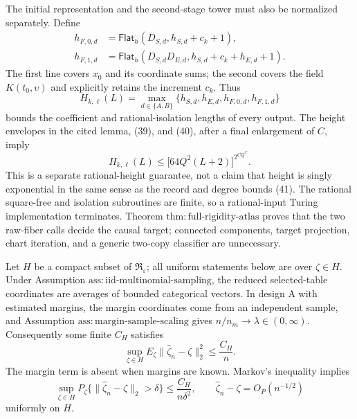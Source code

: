 The initial representation and the second-stage tower must also be normalized separately.  Define
\[
 \begin{aligned}
 h_{F,0,d}
 &=\mathsf{Flat}_h(D_{S,d},h_{S,d}+c_k+1),\\
 h_{F,1,d}
 &=\mathsf{Flat}_h
   (D_{S,d}D_{E,d},h_{S,d}+c_k+h_{E,d}+1).
 \end{aligned}                                             \tag{45}
\]
The first line covers \(x_0\) and its coordinate sums; the second covers the field \(K(t_0,\upsilon)\) and explicitly retains the increment \(c_k\).  Thus
\[
 H_{k,\ell}(L)
 =\max_{d\in\{A,B\}}
   \{h_{S,d},h_{E,d},h_{F,0,d},h_{F,1,d}\}               \tag{46}
\]
bounds the coefficient and rational-isolation lengths of every output.  The height envelopes in the cited lemma, (39), and (40), after a final enlargement of \(C\), imply
\[
 H_{k,\ell}(L)
 \le \bigl[64Q^2(L+2)\bigr]^{2^{CQ^C}}.                  \tag{47}
\]
This is a separate rational-height guarantee, not a claim that height is singly exponential in the same sense as the record and degree bounds (41).  The rational square-free and isolation subroutines are finite, so a rational-input Turing implementation terminates.  Theorem \(\mathrm{thm{:}full\text{-}rigidity\text{-}atlas}\) proves that the two raw-fiber calls decide the causal target; connected components, target projection, chart iteration, and a generic two-copy classifier are unnecessary.

Let \(H\) be a compact subset of \(\mathfrak R_{\varepsilon}\); all uniform statements below are over \(\zeta\in H\).  Under Assumption \(\mathrm{ass{:}iid\text{-}multinomial\text{-}sampling}\), the reduced selected-table coordinates are averages of bounded categorical vectors.  In design A with estimated margins, the margin coordinates come from an independent sample, and Assumption \(\mathrm{ass{:}margin\text{-}sample\text{-}scaling}\) gives \(n/n_m\to\lambda\in(0,\infty)\).  Consequently some finite \(C_H\) satisfies
\[
 \sup_{\zeta\in H}
 E_{\zeta}\|\widehat\zeta_n-\zeta\|_2^2
 \le \frac{C_H}{n}.                                      \tag{48}
\]
The margin term is absent when margins are known.  Markov's inequality implies
\[
 \sup_{\zeta\in H}P_{\zeta}
 \{\|\widehat\zeta_n-\zeta\|_2>\delta\}
 \le\frac{C_H}{n\delta^2},
 \qquad
 \widehat\zeta_n-\zeta=O_P(n^{-1/2})                    \tag{49}
\]
uniformly on \(H\).

